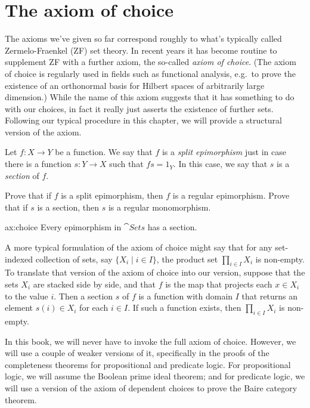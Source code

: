 \section{The axiom of choice}

The axioms we've given so far correspond roughly to what's typically
called Zermelo-Fraenkel (ZF) set theory.  In recent years it has
become routine to supplement ZF with a further axiom, the so-called
{\it axiom of choice}.  (The axiom of choice is regularly used in
fields such as functional analysis, e.g.\ to prove the existence of an
orthonormal basis for Hilbert spaces of arbitrarily large dimension.)
While the name of this axiom suggests that it has something to do with
our choices, in fact it really just asserts the existence of further
sets.  Following our typical procedure in this chapter, we will
provide a structural version of the axiom.

\begin{defn} Let $f:X\to Y$ be a function.  We say that $f$ is a
  \emph{split epimorphism} just in case there is a function $s:Y\to X$
  such that $fs=1_Y$. In this case, we say that $s$ is a
  \emph{section} of $f$. \end{defn}

\begin{exercise} Prove that if $f$ is a split epimorphism, then $f$ is
  a regular epimorphism.  Prove that if $s$ is a section, then $s$ is
  a regular monomorphism. \end{exercise}

\begin{axi}{ax:choice}
  Every epimorphism in $\cat{Sets}$ has a section. \end{axi}

A more typical formulation of the axiom of choice might say that for
any set-indexed collection of sets, say $\{ X_i\mid i\in I\}$, the
product set $\prod _{i\in I}X_i$ is non-empty.  To translate that
version of the axiom of choice into our version, suppose that the sets
$X_i$ are stacked side by side, and that $f$ is the map that projects
each $x\in X_i$ to the value $i$.  Then a section $s$ of $f$ is a
function with domain $I$ that returns an element $s(i)\in X_i$ for
each $i\in I$.  If such a function exists, then $\prod _{i\in I}X_i$
is non-empty.

In this book, we will never have to invoke the full axiom of choice.
However, we will use a couple of weaker versions of it, specifically
in the proofs of the completeness theorems for propositional and
predicate logic.  For propositional logic, we will assume the Boolean
prime ideal theorem; and for predicate logic, we will use a version of
the axiom of dependent choices to prove the Baire category theorem.



